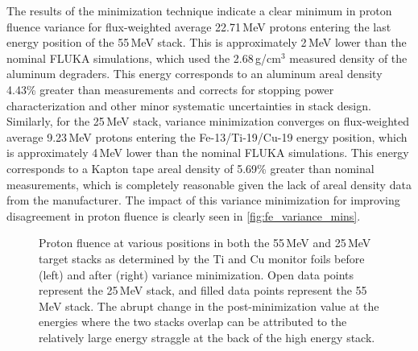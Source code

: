 The results of the minimization technique indicate a clear minimum in proton fluence variance for flux-weighted average 22.71\,MeV protons entering the last energy position of the 55\,MeV stack.
This is approximately 2\,MeV lower than the 
nominal 
FLUKA simulations,
which used the 
2.68\,g/cm$^3$ measured density of the  aluminum degraders.
This energy corresponds to an aluminum areal density  4.43\% greater than 
measurements and 
corrects for stopping power characterization and other minor systematic uncertainties in stack design.
Similarly, for the 25\,MeV stack, variance minimization converges on  flux-weighted average 9.23\,MeV protons entering the Fe-13/Ti-19/Cu-19 energy position, which is approximately 4\,MeV lower than the nominal FLUKA simulations.
This energy corresponds to a Kapton tape areal density of 5.69\% greater than nominal measurements, which is completely reasonable given the lack of areal density data from the manufacturer.
The impact of this variance minimization for improving disagreement in proton fluence is  clearly  seen in   \autoref{fig:fe_variance_mins}.




\begin{figure}
    \centering
    \caption{Proton fluence at various positions in both the 55\,MeV and 25\,MeV target stacks as determined by the Ti and Cu monitor foils before (left) and after (right) variance minimization. Open data points represent the 25\,MeV stack, and filled data points represent the 55\,MeV stack. The abrupt change in the post-minimization value at the energies where the two stacks overlap can be attributed to the relatively large energy straggle at the back of the high energy stack.}  
     \label{fig:fe_variance_mins}
\end{figure}





